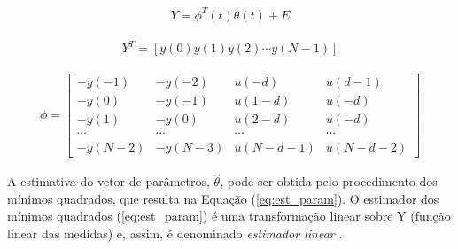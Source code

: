 	\begin{equation}
\label{eq:n_medidas2}
	\begin{split}
Y = \phi^{T}(t)\theta(t) + E
	\end{split}
\end{equation}

	\begin{equation}
\label{eq:vetor_saida}
	\begin{split}
Y^T = \left[y(0) y(1) y(2) \cdots y(N-1) \right]
	\end{split}
\end{equation}

\begin{equation}
\label{eq:matriz_observ}
	\begin{split}
		\phi = \left[\begin{matrix}
		-y(-1) & -y(-2) & u(-d) & u(d-1) \\ 
		-y(0) & -y(-1) & u(1-d) & u(-d)  \\ 
		-y(1) & -y(0) & u(2-d) & u(-d) \\
		\cdots & \cdots & \cdots & \cdots \\ 
		-y(N-2) & -y(N-3) & u(N-d-1) & u(N-d-2)
		\end{matrix} \right]
	\end{split}
\end{equation}



	A estimativa do vetor de parâmetros, $\hat{\theta}$, pode ser obtida pelo procedimento dos mínimos quadrados, que resulta na Equação (\ref{eq:est_param}). O estimador dos mínimos quadrados (\ref{eq:est_param}) é uma transformação linear sobre Y (função linear das medidas) e, assim, é denominado \emph{estimador linear} \cite{COELHO:2015}. 
	

